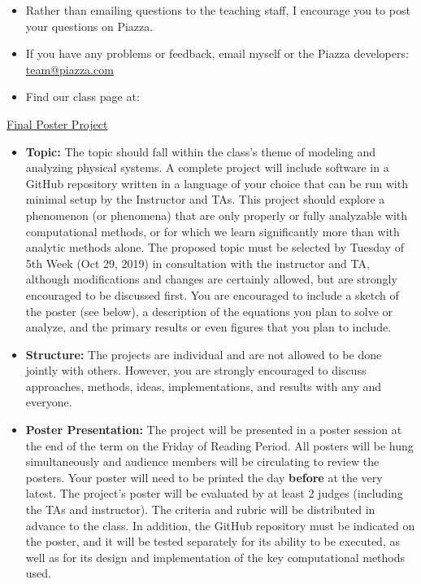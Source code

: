 \begin{itemize}

  \item Rather than emailing questions to the teaching staff, I encourage you to post your questions on Piazza. 

  \item If you have any problems or feedback, email myself or the Piazza developers: \href{mailto:team@piazza.com}{team@piazza.com}

  \item Find our class page at: \PiazzaLink
  
\end{itemize}  


\noindent \underline{Final Poster Project}

\begin{itemize}

  \item \textbf{Topic:} The topic should fall within the class's theme of modeling and analyzing physical systems. A complete project will include software in a GitHub repository written in a language of your choice that can be run with minimal setup by the Instructor and TAs. This project should explore a phenomenon (or phenomena) that are only properly or fully analyzable with computational methods, or for which we learn significantly more than with analytic methods alone. The proposed topic must be selected by Tuesday of 5th Week (Oct 29, 2019) in consultation with the instructor and TA, although modifications and changes are certainly allowed, but are strongly encouraged to be discussed first. You are encouraged to include a sketch of the poster (see below), a description of the equations you plan to solve or analyze, and the primary results or even figures that you plan to include.

  \item \textbf{Structure:} The projects are individual and are not allowed to be done jointly with others. However, you are strongly encouraged to discuss approaches, methods, ideas, implementations, and results with any and everyone.

  \item \textbf{Poster Presentation:} The project will be presented in a poster session at the end of the term on the Friday of Reading Period. All posters will be hung simultaneously and audience members will be circulating to review the posters. Your poster will need to be printed the day \textbf{before} at the very latest. The project's poster will be evaluated by at least 2 judges (including the TAs and instructor). The criteria and rubric will be distributed in advance to the class. In addition, the GitHub repository must be indicated on the poster, and it will be tested separately for its ability to be executed, as well as for its design and implementation of the key computational methods used. 
  
\end{itemize}  

